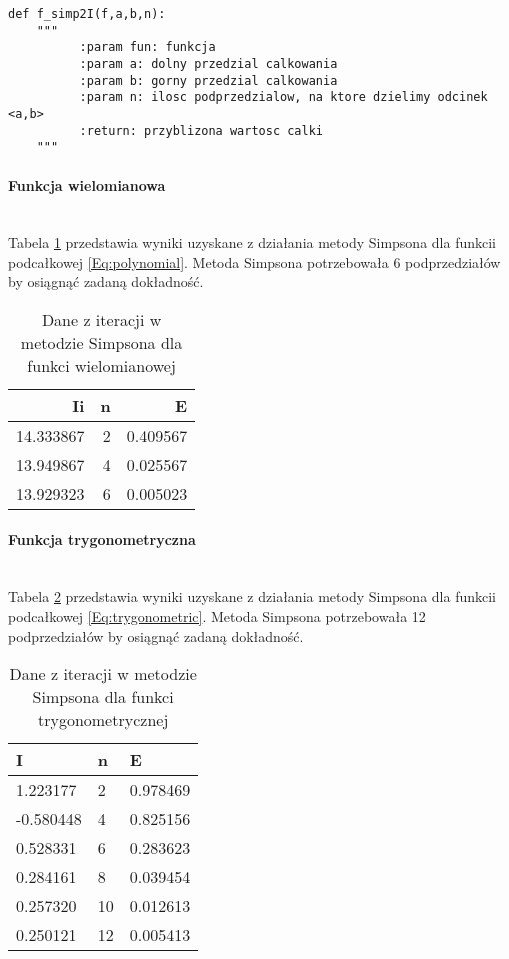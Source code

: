 \documentclass[12pt,twoside]{article}
\begin{document}
\begin{lstlisting}[caption={Kod w języku python implementujący metodę Simpsona}]
def f_simp2I(f,a,b,n):
    """
     	  :param fun: funkcja
          :param a: dolny przedzial calkowania
          :param b: gorny przedzial calkowania
          :param n: ilosc podprzedzialow, na ktore dzielimy odcinek <a,b>
          :return: przyblizona wartosc calki
    """
\end{lstlisting}
\label{Listing 8}

\paragraph{Funkcja wielomianowa}\mbox{} \\

Tabela \ref{tabela3.1} przedstawia wyniki uzyskane z działania metody Simpsona dla funkcii podcałkowej \eqref{Eq:polynomial}. Metoda Simpsona potrzebowała 6 podprzedziałów by osiągnąć zadaną dokładność.

\begin{table}[H]
\centering 
\caption{Dane z iteracji w metodzie Simpsona dla funkci wielomianowej}
\label{tabela3.1}
\begin{tabular}{rrr}
\toprule
Ii &  n &      E \\
\midrule
14.333867 &       2 &  0.409567 \\
13.949867 &       4 & 0.025567 \\
13.929323 &       6 &  0.005023 \\
\bottomrule
\end{tabular}
\end{table}

\paragraph{Funkcja trygonometryczna}\mbox{} \\

Tabela \ref{tabela3.2} przedstawia wyniki uzyskane z działania metody Simpsona dla funkcii podcałkowej \eqref{Eq:trygonometric}. Metoda Simpsona potrzebowała 12 podprzedziałów by osiągnąć zadaną dokładność.

\begin{table}[H]
\centering
\caption{Dane z iteracji w metodzie Simpsona dla funkci trygonometrycznej}
\label{tabela3.2}
\begin{tabular}{lll}
\toprule
I &  n &      E \\
\midrule
1.223177 &       2 &  0.978469 \\
-0.580448 &       4 & 0.825156 \\
0.528331 &       6 &  0.283623 \\
0.284161 &       8 &  0.039454 \\
0.257320 &      10 &  0.012613 \\
0.250121 &      12 &  0.005413 \\
\bottomrule
\end{tabular}
\end{table}
\end{document}
